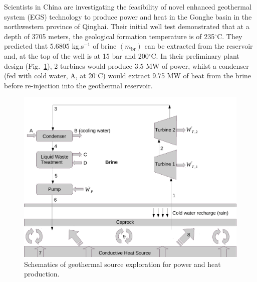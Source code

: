 \documentclass[calculator,allquestions,datasheet,solutions]{exam_newMarcus2}
\begin{document}
\begin{question}
\begin{enumerate}[a)]
{}
  \end{enumerate}
\end{question}

\clearpage

\begin{question}
   Scientists in China are investigating the feasibility of novel enhanced geothermal system (EGS) technology to produce power and heat in the Gonghe basin in the northwestern province of Qinghai. Their initial well test demonstrated that at a depth of 3705 meters, the geological formation temperature is of 235$^{\circ}$C.  They predicted that 5.6805 kg.s$^{-1}$ of brine $\left(m_{\text{br}}\right)$ can be extracted from the reservoir and, at the top of the well is at 15 bar and 200$^{\circ}$C. In their preliminary plant design (Fig.~\ref{Figure:Fig1}), 2 turbines would produce 3.5 MW of power, whilst a condenser (fed with cold water, A, at 20$^{\circ}$C) would extract 9.75 MW of heat from the brine before re-injection into the geothermal reservoir. 
      \begin{figure}[h]
        \begin{center}
          \includegraphics[width=.8\linewidth,clip]{./Pics/Exam2_PowerPorousMedia.pdf}
          \caption{Schematics of geothermal source exploration for power and heat production.}\label{Figure:Fig1}
        \end{center}
      \end{figure}
      

\end{question}
\end{document}
